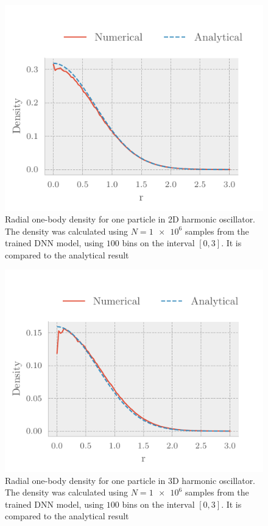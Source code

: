 \begin{figure}[H]
	\includegraphics[]{figures/one_part_2D_dens.pdf}
	\caption{Radial one-body density for one particle in 2D harmonic oscillator.
      The density was calculated using $N=\num{1e6}$ samples from the trained DNN
      model, using $100$ bins on the interval $[0,3]$. It is compared to the
      analytical result} 
	\label{fig:one_part_2D_dens}
\end{figure}

\begin{figure}[H]
	\includegraphics[]{figures/one_part_3D_dens.pdf}
	\caption{Radial one-body density for one particle in 3D harmonic oscillator.
      The density was calculated using $N=\num{1e6}$ samples from the trained DNN
      model, using $100$ bins on the interval $[0,3]$. It is compared to the
      analytical result} 
	\label{fig:one_part_3D_dens}
\end{figure}


